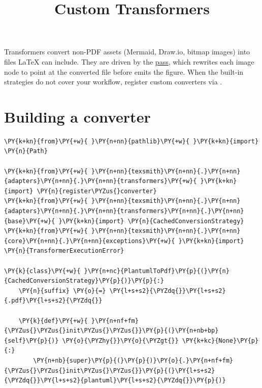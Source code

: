 \documentclass[a4paper,twoside]{article}
\title{Custom Transformers}
\author{}\date{}
\begin{document}
\maketitle
Transformers convert non-PDF assets (Mermaid, Draw.io, bitmap images) into files
\LaTeX{} can include. They are driven by the \href{handlers.md\#ir-passes}{ pass},
which rewrites each image node to point at the converted file before
 emits the figure. When the built-in strategies do not cover your
workflow, register custom converters via
.
\section{Building a converter}
\begin{tscode}[lang=python, engine=pygments]
\begin{Verbatim}[commandchars=\\\{\},breaklines, breakanywhere, commandchars=\\\{\}]
\PY{k+kn}{from}\PY{+w}{ }\PY{n+nn}{pathlib}\PY{+w}{ }\PY{k+kn}{import} \PY{n}{Path}

\PY{k+kn}{from}\PY{+w}{ }\PY{n+nn}{texsmith}\PY{n+nn}{.}\PY{n+nn}{adapters}\PY{n+nn}{.}\PY{n+nn}{transformers}\PY{+w}{ }\PY{k+kn}{import} \PY{n}{register\PYZus{}converter}
\PY{k+kn}{from}\PY{+w}{ }\PY{n+nn}{texsmith}\PY{n+nn}{.}\PY{n+nn}{adapters}\PY{n+nn}{.}\PY{n+nn}{transformers}\PY{n+nn}{.}\PY{n+nn}{base}\PY{+w}{ }\PY{k+kn}{import} \PY{n}{CachedConversionStrategy}
\PY{k+kn}{from}\PY{+w}{ }\PY{n+nn}{texsmith}\PY{n+nn}{.}\PY{n+nn}{core}\PY{n+nn}{.}\PY{n+nn}{exceptions}\PY{+w}{ }\PY{k+kn}{import} \PY{n}{TransformerExecutionError}

\PY{k}{class}\PY{+w}{ }\PY{n+nc}{PlantumlToPdf}\PY{p}{(}\PY{n}{CachedConversionStrategy}\PY{p}{)}\PY{p}{:}
    \PY{n}{suffix} \PY{o}{=} \PY{l+s+s2}{\PYZdq{}}\PY{l+s+s2}{.pdf}\PY{l+s+s2}{\PYZdq{}}

    \PY{k}{def}\PY{+w}{ }\PY{n+nf+fm}{\PYZus{}\PYZus{}init\PYZus{}\PYZus{}}\PY{p}{(}\PY{n+nb+bp}{self}\PY{p}{)} \PY{o}{\PYZhy{}}\PY{o}{\PYZgt{}} \PY{k+kc}{None}\PY{p}{:}
        \PY{n+nb}{super}\PY{p}{(}\PY{p}{)}\PY{o}{.}\PY{n+nf+fm}{\PYZus{}\PYZus{}init\PYZus{}\PYZus{}}\PY{p}{(}\PY{l+s+s2}{\PYZdq{}}\PY{l+s+s2}{plantuml}\PY{l+s+s2}{\PYZdq{}}\PY{p}{)}


\end{Verbatim}
\end{tscode}
\end{document}
